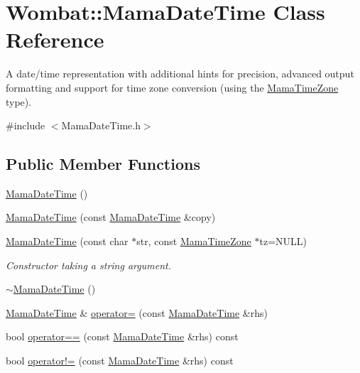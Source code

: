 \hypertarget{classWombat_1_1MamaDateTime}{
\section{Wombat::MamaDateTime Class Reference}
\label{classWombat_1_1MamaDateTime}
}


A date/time representation with additional hints for precision, advanced output formatting and support for time zone conversion (using the \hyperlink{classWombat_1_1MamaTimeZone}{MamaTimeZone} type).  


{\ttfamily \#include $<$MamaDateTime.h$>$}\subsection*{Public Member Functions}
\begin{DoxyCompactItemize}
\item 
\hyperlink{classWombat_1_1MamaDateTime_a1e942afab603d2d088c26370c220ecbc}{MamaDateTime} ()
\item 
\hyperlink{classWombat_1_1MamaDateTime_a8b9455884f78334223fa1982780d1a64}{MamaDateTime} (const \hyperlink{classWombat_1_1MamaDateTime}{MamaDateTime} \&copy)
\item 
\hyperlink{classWombat_1_1MamaDateTime_a51d3d35fc26c18f3807426233e23021d}{MamaDateTime} (const char $\ast$str, const \hyperlink{classWombat_1_1MamaTimeZone}{MamaTimeZone} $\ast$tz=NULL)
\begin{DoxyCompactList}\small\item\em Constructor taking a string argument. \item\end{DoxyCompactList}\item 
\hyperlink{classWombat_1_1MamaDateTime_a8cac3d8a2bda4a2448f1ddd77325da59}{$\sim$MamaDateTime} ()
\item 
\hyperlink{classWombat_1_1MamaDateTime}{MamaDateTime} \& \hyperlink{classWombat_1_1MamaDateTime_ac7cd923eb7faa640d4302c77ca52358c}{operator=} (const \hyperlink{classWombat_1_1MamaDateTime}{MamaDateTime} \&rhs)
\item 
bool \hyperlink{classWombat_1_1MamaDateTime_a62e1f438c1ad0a899bdacb39d20c86cf}{operator==} (const \hyperlink{classWombat_1_1MamaDateTime}{MamaDateTime} \&rhs) const 
\item 
bool \hyperlink{classWombat_1_1MamaDateTime_a7f8ea791ba3ad83e644700a8ffe8451e}{operator!=} (const \hyperlink{classWombat_1_1MamaDateTime}{MamaDateTime} \&rhs) const 
\item 

\end{DoxyCompactItemize}
